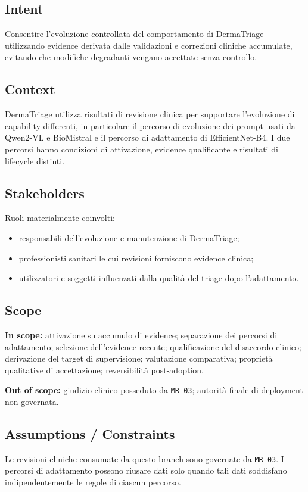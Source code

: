 \documentclass[11pt,a4paper]{article}
\begin{document}
\subsection{Intent}
Consentire l'evoluzione controllata del comportamento di DermaTriage utilizzando evidence derivata dalle validazioni e correzioni cliniche accumulate, evitando che modifiche degradanti vengano accettate senza controllo.

\subsection{Context}
DermaTriage utilizza risultati di revisione clinica per supportare l'evoluzione di capability differenti, in particolare il percorso di evoluzione dei prompt usati da Qwen2-VL e BioMistral e il percorso di adattamento di EfficientNet-B4. I due percorsi hanno condizioni di attivazione, evidence qualificante e risultati di lifecycle distinti.

\subsection{Stakeholders}
Ruoli materialmente coinvolti:
\begin{itemize}
\item responsabili dell'evoluzione e manutenzione di DermaTriage;
\item professionisti sanitari le cui revisioni forniscono evidence clinica;
\item utilizzatori e soggetti influenzati dalla qualità del triage dopo l'adattamento.
\end{itemize}

\subsection{Scope}
\textbf{In scope:} attivazione su accumulo di evidence; separazione dei percorsi di adattamento; selezione dell'evidence recente; qualificazione del disaccordo clinico; derivazione del target di supervisione; valutazione comparativa; proprietà qualitative di accettazione; reversibilità post-adoption.

\textbf{Out of scope:} giudizio clinico posseduto da \texttt{MR-03}; autorità finale di deployment non governata.

\subsection{Assumptions / Constraints}
Le revisioni cliniche consumate da questo branch sono governate da \texttt{MR-03}. I percorsi di adattamento possono riusare dati solo quando tali dati soddisfano indipendentemente le regole di ciascun percorso.
\end{document}
